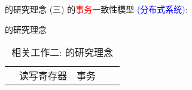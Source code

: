 \begin{frame}{\ideadt{}的研究理念 (三)}
  \ideadt{}的\textcolor{red}{事务}一致性模型 \textcolor{blue}{\footnotesize (分布式系统)}:
\end{frame}
\begin{frame}{\idearm{}的研究理念}
  \begin{table}
	\centering
	\begin{tabular}{|c|c|c|c|c|}
	  \hline
	  & 读写寄存器 & 事务
	\end{tabular}
	\caption{相关工作二: \idearm{}的研究理念}
	\label{tbl:idearm-related-work}
  \end{table}
\end{frame}
